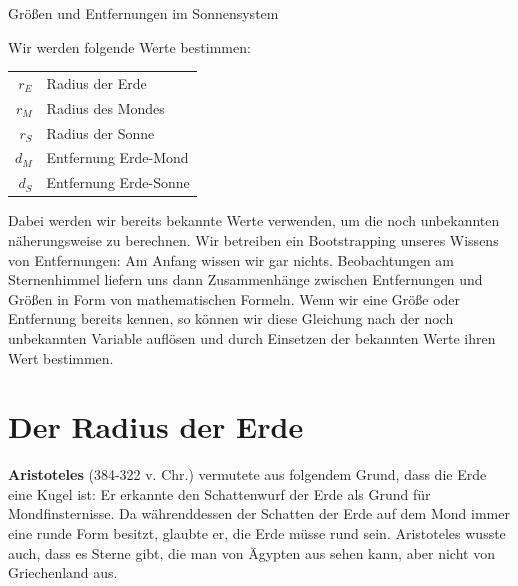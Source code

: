 \documentclass{scrartcl}
\newcommand{\RE}{r_E} %
\newcommand{\RM}{r_M} %
\newcommand{\RS}{r_S} %
\newcommand{\DM}{d_M} %
\newcommand{\DS}{d_S} %
\newcommand{\person}[1]{\textbf{#1}} %
\begin{document}

  \begin{center}
    \Huge Größen und Entfernungen im Sonnensystem \\[1em]
  \end{center}

  Wir werden folgende Werte bestimmen:

  \begin{center}
    \begin{tabular}{r l}
      $\RE$ & Radius der Erde \\
      $\RM$ & Radius des Mondes \\
      $\RS$ & Radius der Sonne \\
      $\DM$ & Entfernung Erde-Mond \\
      $\DS$ & Entfernung Erde-Sonne \\
    \end{tabular}
  \end{center}

  Dabei werden wir bereits bekannte Werte verwenden, um die noch unbekannten näherungsweise zu berechnen. Wir betreiben ein Bootstrapping unseres Wissens von Entfernungen: Am Anfang wissen wir gar nichts. Beobachtungen am Sternenhimmel liefern uns dann Zusammenhänge zwischen Entfernungen und Größen in Form von mathematischen Formeln. Wenn wir eine Größe oder Entfernung bereits kennen, so können wir diese Gleichung nach der noch unbekannten Variable auflösen und durch Einsetzen der bekannten Werte ihren Wert bestimmen.

  \newpage

  \section{Der Radius der Erde}

  \person{Aristoteles} (384-322 v. Chr.) vermutete aus folgendem Grund, dass die Erde eine Kugel ist:
  Er erkannte den Schattenwurf der Erde als Grund für Mondfinsternisse.
  Da währenddessen der Schatten der Erde auf dem Mond immer eine runde Form besitzt, glaubte er, die Erde müsse rund sein.
  Aristoteles wusste auch, dass es Sterne gibt, die man von Ägypten aus sehen kann, aber nicht von Griechenland aus.
\end{document}
